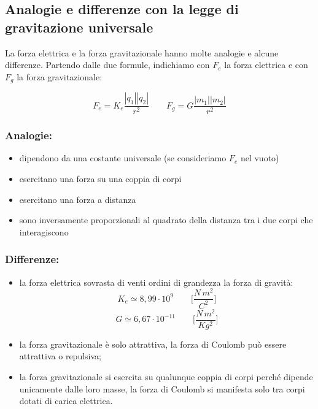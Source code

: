 \subsection{Analogie e differenze con la legge di gravitazione universale}
La forza elettrica e la forza gravitazionale hanno molte analogie e alcune differenze. Partendo dalle due formule, indichiamo con $F_e$ la forza elettrica e con $F_g$ la forza gravitazionale:

\begin{equation*}
    F_e = K_e\frac{|q_1||q_2|}{r^2} \qquad F_g = G\frac{|m_1||m_2|}{r^2}
\end{equation*}

\subsubsection{Analogie:}
\begin{itemize}
    \item dipendono da una costante universale (se consideriamo $F_e$ nel vuoto)
    \item esercitano una forza su una coppia di corpi
    \item esercitano una forza a distanza
    \item sono inversamente proporzionali al quadrato della distanza tra i due corpi che interagiscono
\end{itemize}
\subsubsection{Differenze:}
\begin{itemize}
    \item la forza elettrica sovrasta di venti ordini di grandezza la forza di gravità:
        \begin{equation*}
            K_e \simeq 8,99\cdot10^{9}\qquad \biggl[\frac{N\,m^2}{C^2}\biggl]
        \end{equation*}
        \begin{equation*}
            G \simeq 6,67\cdot10^{-11}\qquad \biggl[\frac{N\,m^2}{Kg^2}\biggl]
        \end{equation*}
    \item la forza gravitazionale è solo attrattiva, la forza di Coulomb può essere attrattiva o repulsiva;
    \item la forza gravitazionale si esercita su qualunque coppia di corpi perché dipende unicamente dalle loro masse, la forza di Coulomb si manifesta solo tra corpi dotati di carica elettrica.
\end{itemize}

